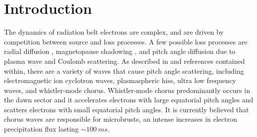\documentclass[draft,linenumbers]{agujournal}
\begin{document}
%
% 
% 
% 

\section{Introduction}\label{Intro}
The dynamics of radiation belt electrons are complex, and are driven by competition between source and loss processes. A few possible loss processes are radial diffusion \citep{Shprits04}, magnetopause shadowing \citep{Ukhorskiy06}, and pitch angle diffusion \citep{Selesnick03, Abel1998_1} due to plasma wave and Coulomb scattering. As described in \citep{Millan07, Thorne10} and references contained within, there are a variety of waves that cause pitch angle scattering, including electromagnetic ion cyclotron waves, plasmaspheric hiss, ultra low frequency waves, and whistler-mode chorus. Whistler-mode chorus predominantly occurs in the dawn sector \citep{Li09} and it accelerates electrons with large equatorial pitch angles and scatters electrons with small equatorial pitch angles\citep{Horne03}. It is currently believed that chorus waves are responsible for microbrusts, an intense increases in electron precipitation flux lasting $\sim100 \ ms$. 
\end{document}
